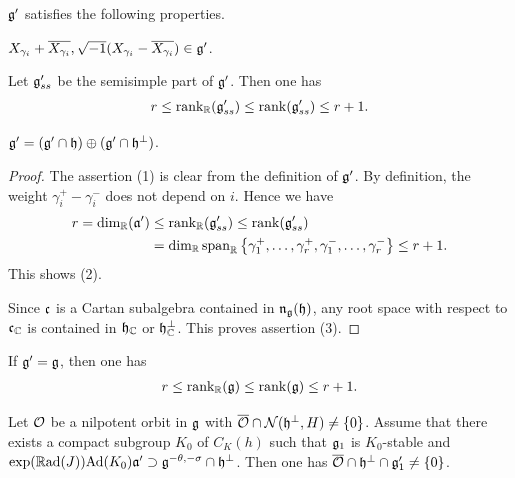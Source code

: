 \begin{lemma} \label{lem:SmallSubalgebraStronglyOrthogonal}
	$\mathfrak{g'}$ satisfies the following properties.
	\begin{enumparen}
		\item $X_{\gamma_i} + \overline{X_{\gamma_i}}, \sqrt{-1}(X_{\gamma_i} - \overline{X_{\gamma_i}}) \in \mathfrak{g'}$.
		\item Let $\mathfrak{g}'_{ss}$ be the semisimple part of $\mathfrak{g'}$. Then one has
		\begin{align*}
			r \leq \operatorname{rank}_{\mathbb{R}}(\mathfrak{g}'_{ss}) \leq \operatorname{rank}(\mathfrak{g}'_{ss}) \leq r + 1.
		\end{align*}
		\item $\mathfrak{g'} = (\mathfrak{g'} \cap \mathfrak{h}) \oplus (\mathfrak{g'} \cap \mathfrak{h}^\perp)$.
	\end{enumparen}
\end{lemma}

\begin{proof}
	The assertion (1) is clear from the definition of $\mathfrak{g'}$.
	By definition, the weight $\gamma^+_i - \gamma^-_i$ does not depend on $i$.
	Hence we have
	\begin{align*}
		r = \dim_{\mathbb{R}}(\mathfrak{a'}) &\leq \operatorname{rank}_{\mathbb{R}}(\mathfrak{g}'_{ss}) \leq \operatorname{rank}(\mathfrak{g}'_{ss}) \\
		&= \dim_{\mathbb{R}}\mathrm{span}_{\mathbb{R}}\left\{\gamma^+_1, \ldots, \gamma^+_r, \gamma^-_1, \ldots, \gamma^-_r \right\} \leq r + 1.
	\end{align*}
	This shows (2).

	Since $\mathfrak{c}$ is a Cartan subalgebra contained in $\mathfrak{n}_{\mathfrak{g}}(\mathfrak{h})$, any root space with respect to $\mathfrak{c}_{\mathbb{C}}$ is contained in $\mathfrak{h}_{\mathbb{C}}$ or $\mathfrak{h}_{\mathbb{C}}^\perp$.
	This proves assertion (3).
\end{proof}

\begin{corollary} \label{cor:SmallG'}
	If $\mathfrak{g'} = \mathfrak{g}$, then one has
	\begin{align*}
		r \leq \operatorname{rank}_{\mathbb{R}}(\mathfrak{g}) \leq \operatorname{rank}(\mathfrak{g}) \leq r + 1.
	\end{align*}
\end{corollary}

\begin{lemma} \label{lem:SufficientForSecondReduction}
	Let $\mathcal{O}$ be a nilpotent orbit in $\mathfrak{g}$ with $\overline{\mathcal{O}} \cap \mathcal{N}(\mathfrak{h}^\perp, H) \neq \left\{0 \right\}$.
	Assume that there exists a compact subgroup $K_0$ of $C_K(h)$ such that $\mathfrak{g}_1$ is $K_0$-stable and $\exp(\mathbb{R} \mathrm{ad}(J))\mathrm{Ad}(K_0) \mathfrak{a'} \supset \mathfrak{g}^{-\theta, -\sigma} \cap \mathfrak{h}^\perp$.
	Then one has $\overline{\mathcal{O}} \cap \mathfrak{h}^\perp \cap \mathfrak{g}'_1 \neq \left\{0 \right\}$.
\end{lemma}

